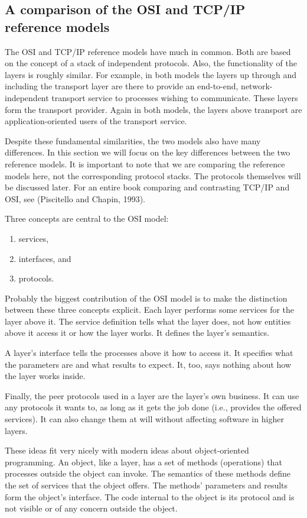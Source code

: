 \subsection{A comparison of the OSI and TCP/IP reference models}

The OSI and TCP/IP reference models have much in common. Both are based
on the concept of a stack of independent protocols. Also, the
functionality of the layers is roughly similar. For example, in both
models the layers up through and including the transport layer are there
to provide an end-to-end, network-independent transport service to
processes wishing to communicate. These layers form the transport
provider. Again in both models, the layers above transport are
application-oriented users of the transport service.

Despite these fundamental similarities, the two models also have many
differences. In this section we will focus on the key differences
between the two reference models. It is important to note that we are
comparing the {reference models} here, not the corresponding {protocol
stacks}. The protocols themselves will be discussed later. For an entire
book comparing and contrasting TCP/IP and OSI, see (Piscitello and
Chapin, 1993).

Three concepts are central to the OSI model:
\begin{enumerate}
\item services,
\item interfaces, and
\item protocols.
\end{enumerate}

Probably the biggest contribution of the OSI model is to make the distinction between these three concepts explicit.
Each layer performs some services for the layer above it. The {service} definition tells what the layer does, not how entities above it access it or how the
layer works. It defines the layer's semantics.

A layer's {interface} tells the processes above it how to access it. It
specifies what the parameters are and what results to expect. It, too,
says nothing about how the layer works inside.

Finally, the peer {protocols} used in a layer are the layer's own
business. It can use any protocols it wants to, as long as it gets the
job done (i.e., provides the offered services). It can also change them
at will without affecting software in higher layers.

These ideas fit very nicely with modern ideas about object-oriented
programming. An object, like a layer, has a set of methods (operations)
that processes outside the object can invoke. The semantics of these
methods define the set of services that the object offers. The methods'
parameters and results form the object's interface. The code internal to
the object is its protocol and is not visible or of any concern outside
the object.

